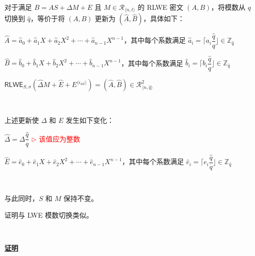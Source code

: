 \begin{tcolorbox}[title={\textbf{\tboxlabel{\ref*{subsec:modulus-switch-rlwe}} RLWE 模数切换}}]

对于满足 $B = AS + \Delta M + E$ 且 $M \in \mathcal{R}_{\langle n, t \rangle}$ 的 RLWE 密文 $(A, B)$，将模数从 $q$ 切换到 $\hat q$，等价于将 $(A, B)$ 更新为 $(\hat A, \hat B)$，具体如下：


$\hat{A} = \hat{a}_0 + \hat{a}_1X + \hat{a}_2X^2 + \cdots + \hat{a}_{n-1}X^{n-1}$，其中每个系数满足 $\hat{a}_i = \Big\lceil a_i\dfrac{\hat{q}}{q} \Big\rfloor \in \mathbb{Z}_{\hat{q}}$

$\hat{B} = \hat{b}_0 + \hat{b}_1X + \hat{b}_2X^2 + \cdots + \hat{b}_{n-1}X^{n-1}$，其中每个系数满足 $\hat{b}_i = \Big\lceil b_i\dfrac{\hat{q}}{q} \Big\rfloor \in \mathbb{Z}_{\hat{q}}$

$\textsf{RLWE}_{{S},\sigma}(\hat{\Delta}  M + \hat{E} + E^{\langle \epsilon_{\textit{all}} \rangle}) = (\hat{A}, \hat{B}) \in \mathcal{R}_{\langle n, \hat{q} \rangle}^{2}$ 

$ $

上述更新使 $\Delta$ 和 $E$ 发生如下变化：

$\hat{\Delta} = \Delta\dfrac{\hat{q}}{q}$ \textcolor{red}{ $\rhd$ 该值应为整数}

$\hat{E} = \hat{e}_0 + \hat{e}_1X + \hat{e}_2X^2 + \cdots + \hat{e}_{n-1}X^{n-1}$，其中每个系数满足 $\hat{e}_i = \Big\lceil e_i\dfrac{\hat{q}}{q} \Big\rfloor \in \mathbb{Z}_{\hat{q}}$

$ $

与此同时，$S$ 和 $M$ 保持不变。

\end{tcolorbox}

证明与 LWE 模数切换类似。

$ $

\textbf{\underline{证明}}

